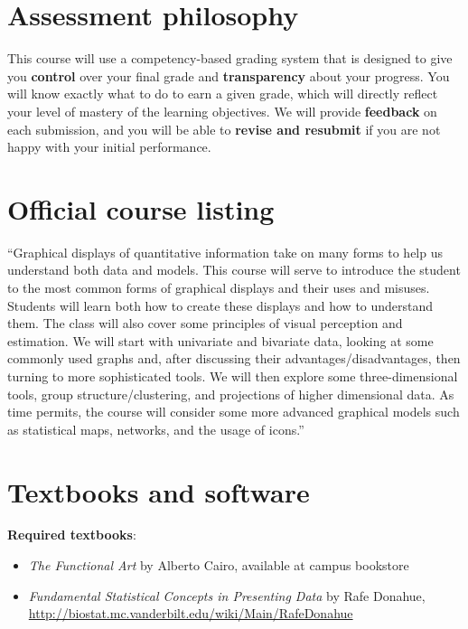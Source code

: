 \documentclass[12pt]{article}
\begin{document}
\section*{Assessment philosophy}
This course will use a competency-based grading system that is designed to give you \textbf{control} over your final grade and \textbf{transparency} about your progress. You will know exactly what to do to earn a given grade, which will directly reflect your level of mastery of the learning objectives. We will provide \textbf{feedback} on each submission, and you will be able to \textbf{revise and resubmit} if you are not happy with your initial performance.

\section*{Official course listing}
``Graphical displays of quantitative information take on many forms to help us understand both data and models. This course will serve to introduce the student to the most common forms of graphical displays and their uses and misuses. Students will learn both how to create these displays and how to understand them. The class will also cover some principles of visual perception and estimation. We will start with univariate and bivariate data, looking at some commonly used graphs and, after discussing their advantages/disadvantages, then turning to more sophisticated tools. We will then explore some three-dimensional tools, group structure/clustering, and projections of higher dimensional data. As time permits, the course will consider some more advanced graphical models such as statistical maps, networks, and the usage of icons.''

\section*{Textbooks and software}

\textbf{Required textbooks}:
\begin{itemize}
	\item \emph{The Functional Art} by Alberto Cairo, available at campus bookstore
	\item \emph{Fundamental Statistical Concepts in Presenting Data} by Rafe Donahue,\\
\url{http://biostat.mc.vanderbilt.edu/wiki/Main/RafeDonahue}
\end{itemize}
\end{document}
